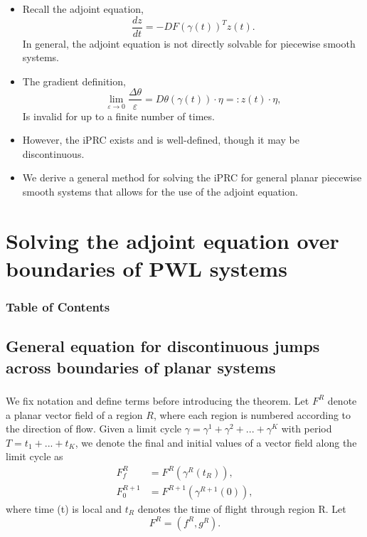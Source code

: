 \documentclass{beamer}
\begin{document}
\begin{frame}
\begin{itemize}

\item Recall the adjoint equation,
\begin{equation}
 \frac{dz}{dt} = -DF(\gamma(t))^T z(t).
\end{equation}
In general, the adjoint equation is not directly solvable for piecewise smooth systems.

\item The gradient definition,
\begin{equation}
 \lim_{\varepsilon \rightarrow 0} \frac{\Delta \theta}{\varepsilon} = D\theta(\gamma(t))\cdot \eta =: z(t) \cdot \eta,
\end{equation}
Is invalid for up to a finite number of times.

\item However, the iPRC exists and is well-defined, though it may be discontinuous.

\item We derive a general method for solving the iPRC for general planar piecewise smooth systems that allows for the use of the adjoint equation.
\end{itemize}
\end{frame}



\section{Solving the adjoint equation over boundaries of PWL systems}
\begin{frame}
\frametitle{Table of Contents}
\tableofcontents[currentsection]
\end{frame}



\subsection{General equation for discontinuous jumps across boundaries of planar systems}
  \begin{frame}
 \frametitle{\insertsection}
 \framesubtitle{\insertsubsection}
We fix notation and define terms before introducing the theorem. Let $F^R$ denote a planar vector field of a region $R$, where each region is numbered according to the direction of flow.  Given a limit cycle $\gamma = \gamma^1 + \gamma^2 +...+\gamma^K$ with period $T = t_1 +...+t_K$, we denote the final and initial values of a vector field along the limit cycle as
\begin{equation}
\begin{split}
F^R_f &= F^R(\gamma^R(t_R)),\\
F^{R+1}_0 &= F^{R+1}(\gamma^{R+1}(0)),
\end{split}
\end{equation}
where time (t) is local and $t_R$ denotes the time of flight through region R.  Let
\begin{equation}
 F^{R} = (f^{R}, g^{R}).
\end{equation}



  \end{frame}
  
\end{document}
